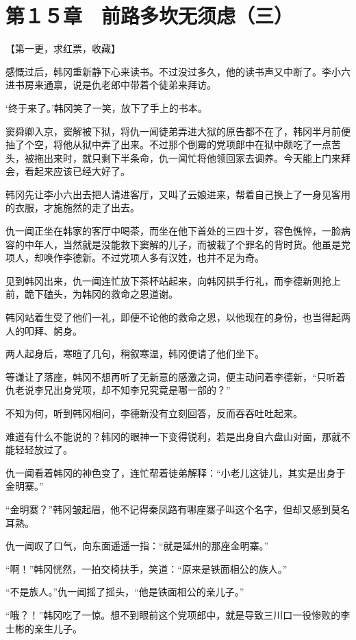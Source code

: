 \section{第１５章　前路多坎无须虑（三）   }

【第一更，求红票，收藏】

感慨过后，韩冈重新静下心来读书。不过没过多久，他的读书声又中断了。李小六进书房来通禀，说是仇老郎中带着个徒弟来拜访。

‘终于来了。’韩冈笑了一笑，放下了手上的书本。

窦舜卿入京，窦解被下狱，将仇一闻徒弟弄进大狱的原告都不在了，韩冈半月前便抽了个空，将他从狱中弄了出来。不过那个倒霉的党项郎中在狱中颇吃了一点苦头，被拖出来时，就只剩下半条命，仇一闻忙将他领回家去调养。今天能上门来拜会，看起来应该已经大好了。

韩冈先让李小六出去把人请进客厅，又叫了云娘进来，帮着自己换上了一身见客用的衣服，才施施然的走了出去。

仇一闻正坐在韩家的客厅中喝茶，而坐在他下首处的三四十岁，容色憔悴，一脸病容的中年人，当然就是没能救下窦解的儿子，而被栽了个罪名的背时货。他虽是党项人，却唤作李德新。不过党项人多有汉姓，也并不足为奇。

见到韩冈出来，仇一闻连忙放下茶杯站起来，向韩冈拱手行礼，而李德新则抢上前，跪下磕头，为韩冈的救命之恩道谢。

韩冈站着生受了他们一礼，即便不论他的救命之恩，以他现在的身份，也当得起两人的叩拜、躬身。

两人起身后，寒暄了几句，稍叙寒温，韩冈便请了他们坐下。

等谦让了落座，韩冈不想再听了无新意的感激之词，便主动问着李德新，“只听着仇老说李兄出身党项，却不知李兄究竟是哪一部的？”

不知为何，听到韩冈相问，李德新没有立刻回答，反而吞吞吐吐起来。

难道有什么不能说的？韩冈的眼神一下变得锐利，若是出身自六盘山对面，那就不能轻轻放过了。

仇一闻看着韩冈的神色变了，连忙帮着徒弟解释：“小老儿这徒儿，其实是出身于金明寨。”

“金明寨？”韩冈皱起眉，他不记得秦凤路有哪座寨子叫这个名字，但却又感到莫名耳熟。

仇一闻叹了口气，向东面遥遥一指：“就是延州的那座金明寨。”

“啊！”韩冈恍然，一拍交椅扶手，笑道：“原来是铁面相公的族人。”

“不是族人。”仇一闻摇了摇头，“他是铁面相公的亲儿子。”

“哦？！”韩冈吃了一惊。想不到眼前这个党项郎中，就是导致三川口一役惨败的李士彬的亲生儿子。

